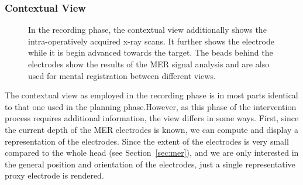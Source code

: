 \documentclass{vgtc}                          %
\begin{document}
\subsubsection{Contextual View}\label{sec:overview:recording:3d}
\begin{figure}
    \centering
    \caption{In the recording phase, the contextual view additionally shows the intra-operatively acquired x-ray scans. It further shows the electrode while it is begin advanced towards the target. The beads behind the electrodes show the results of the MER signal analysis and are also used for mental registration between different views.}
    \label{fig:recordingphase:3d}
\end{figure}

The contextual view as employed in the recording phase is in most parts identical to that one used in the planning phase.However, as this phase of the intervention process requires additional information, the view differs in some ways. First, since the current depth of the MER electrodes is known, we can compute and display a representation of the electrodes. Since the extent of the electrodes is very small compared to the whole head (see Section~\ref{sec:mer}), and we are only interested in the general position and orientation of the electrodes, just a single representative proxy electrode is rendered. 
\end{document}
